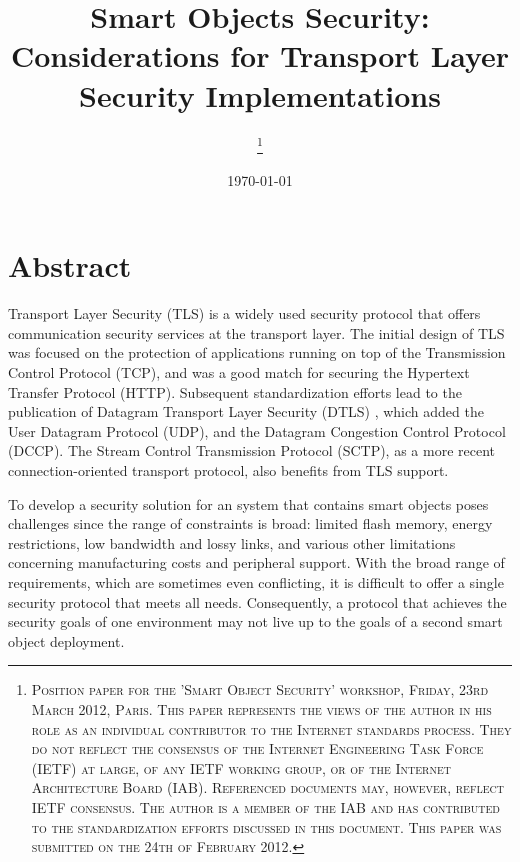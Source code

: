 \documentclass[a4paper, 10pt]{IEEEtran}
\begin{document}
\title{Smart Objects Security: Considerations for Transport Layer Security Implementations}

\author{
\thanks{\textsc{
Position paper for the 'Smart Object Security' workshop, Friday, 23rd March 2012, Paris. This paper represents the views of the author in his role as an individual contributor to the Internet standards process. They do not reflect the consensus of the Internet Engineering Task Force (IETF) at large, of any IETF working group, or of the Internet Architecture Board (IAB). Referenced documents may, however, reflect IETF consensus. The author is a member of the IAB and has contributed to the standardization efforts discussed in this document. This paper was submitted on the 24th of February 2012.}}
}

\date{\today}

\maketitle

\section{Abstract}

Transport Layer Security (TLS) is a widely used security protocol that offers communication security services at the transport layer. The initial design of TLS was focused on the protection of applications running on top of the Transmission Control Protocol (TCP), and was a good match for securing the Hypertext Transfer Protocol (HTTP). Subsequent standardization efforts lead to the publication of Datagram Transport Layer Security (DTLS) \cite{rfc4347}, which added the User Datagram Protocol (UDP), and the Datagram Congestion Control Protocol (DCCP). The Stream Control Transmission Protocol (SCTP), as a more recent connection-oriented transport protocol, also benefits from TLS support.

To develop a security solution for an system that contains smart objects poses challenges since the range of constraints is broad: limited flash memory, energy restrictions, low bandwidth and lossy links, and various other limitations concerning manufacturing costs and peripheral support. With the broad range of requirements, which are sometimes even conflicting, it is difficult to offer a single security protocol that meets all needs. Consequently, a protocol that achieves the security goals of one environment may not live up to the goals of a second smart object deployment. 
\end{document}
